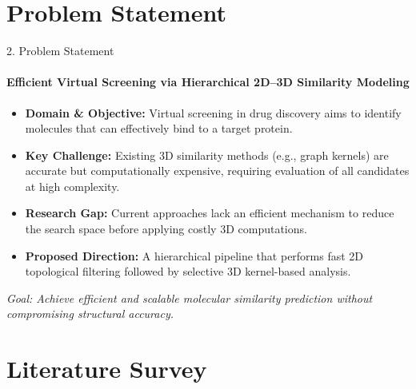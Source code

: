 \documentclass[aspectratio=169, 11pt]{beamer}
\begin{document}
\section{Problem Statement}
\begin{frame}{2. Problem Statement}
\framesubtitle{Efficient Virtual Screening via Hierarchical 2D–3D Similarity Modeling}

\vspace{1em}

\begin{itemize}
\setlength\itemsep{1em}

\item \textbf{Domain \& Objective:} Virtual screening in drug discovery aims to identify molecules that can effectively bind to a target protein.

\item \textbf{Key Challenge:} Existing 3D similarity methods (e.g., graph kernels) are accurate but computationally expensive, requiring evaluation of all candidates at high complexity.

\item \textbf{Research Gap:} Current approaches lack an efficient mechanism to reduce the search space before applying costly 3D computations.

\item \textbf{Proposed Direction:} A hierarchical pipeline that performs fast 2D topological filtering followed by selective 3D kernel-based analysis.

\end{itemize}

\vspace{0.5em}

\centering
\textit{\small Goal: Achieve efficient and scalable molecular similarity prediction without compromising structural accuracy.}

\end{frame}

\section{Literature Survey}
\end{document}
